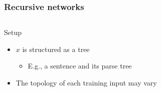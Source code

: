 \documentclass{beamer}
\begin{document}
\begin{frame}
    \frametitle{Recursive networks}

    \begin{columns}
        \begin{column}{0.75\textwidth}
            Setup
            \begin{itemize}
                \item  $x$ is structured as a {\color{blue} tree}
                \begin{itemize}
                    \item E.g., a sentence and its parse tree
                \end{itemize}
                \item The topology of each training input may vary
            \end{itemize}

            \vspace{0.5cm}


\end{column}
\end{columns}
\end{frame}
\end{document}
